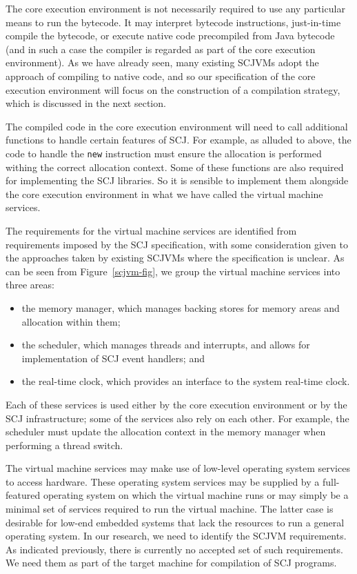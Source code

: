 \documentclass[a4paper,10pt]{report}
\begin{document}
The core execution environment is not necessarily required to use any particular
means to run the bytecode.  It may interpret bytecode instructions, just-in-time
compile the bytecode, or execute native code precompiled from Java bytecode (and 
in such a case the compiler is regarded as part of the core execution
environment).  As we have already seen, many existing SCJVMs adopt the approach 
of compiling to native code, and so our specification of the core execution 
environment will focus on the construction of a compilation strategy, which is
discussed in the next section.

The compiled code in the core execution environment will need to call additional
functions to handle certain features of SCJ.  For example, as alluded to above,
the code to handle the \texttt{new} instruction must ensure the allocation is
performed withing the correct allocation context.  Some of these functions are
also required for implementing the SCJ libraries.  So it is sensible to
implement them alongside the core execution environment in what we have called
the virtual machine services.

The requirements for the virtual machine services are identified from
requirements imposed by the SCJ specification, with some consideration given to
the approaches taken by existing SCJVMs where the specification is unclear.  As
can be seen from Figure~\ref{scjvm-fig}, we group the virtual machine services
into three areas:
\begin{itemize}
\item the memory manager, which manages backing stores for memory areas and
  allocation within them;
\item the scheduler, which manages threads and interrupts, and allows for
  implementation of SCJ event handlers; and
\item the real-time clock, which provides an interface to the system real-time
  clock.
\end{itemize}
Each of these services is used either by the core execution environment or by
the SCJ infrastructure; some of the services also rely on each other.  For
example, the scheduler must update the allocation context in the memory manager
when performing a thread switch.

The virtual machine services may make use of low-level operating system
services to access hardware.  These operating system services may be supplied by
a full-featured operating system on which the virtual machine runs or may simply
be a minimal set of services required to run the virtual machine.  The latter
case is desirable for low-end embedded systems that lack the resources to
run a general operating system.  In our research, we need to identify the SCJVM
requirements.  As indicated previously, there is currently no accepted set of
such requirements.  We need them as part of the target machine for compilation
of SCJ programs.
\end{document}
